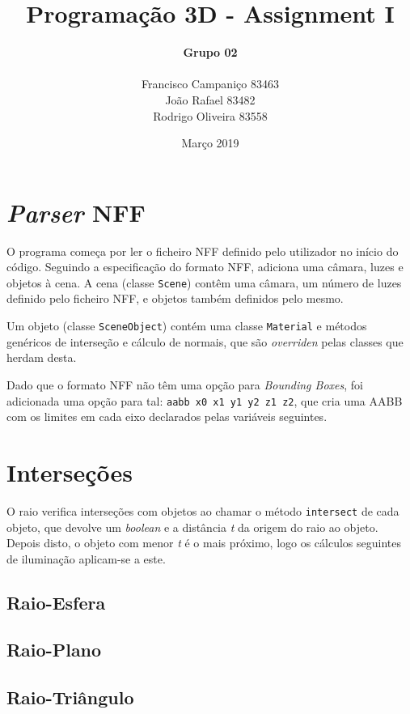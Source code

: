 \documentclass{article}
\title{
    \textbf{Programação 3D - Assignment I}
    }
\author{
    \begin{Large}
        \textbf{Grupo 02}
    \end{Large}\\
    Francisco Campaniço 83463\\
    João Rafael 83482\\
    Rodrigo Oliveira 83558
}
\date{Março 2019}
\begin{document}
    \maketitle

    \section*{\textit{Parser} NFF}

        \par 
        O programa começa por ler o ficheiro NFF definido pelo utilizador no início do código. Seguindo a especificação do formato NFF, adiciona uma câmara, luzes e objetos à cena. A cena (classe \texttt{Scene}) contêm uma câmara, um número de luzes definido pelo ficheiro NFF, e objetos também definidos pelo mesmo.
        \par
        Um objeto (classe \texttt{SceneObject}) contém uma classe \texttt{Material} e métodos genéricos de interseção e cálculo de normais, que são \textit{overriden} pelas classes que herdam desta.
        \par
        Dado que o formato NFF não têm uma opção para \textit{Bounding Boxes}, foi adicionada uma opção para tal: \texttt{aabb x0 x1 y1 y2 z1 z2}, que cria uma AABB com os limites em cada eixo declarados pelas variáveis seguintes.

    \section*{Interseções}

        \par
        O raio verifica interseções com objetos ao chamar o método \texttt{intersect} de cada objeto, que devolve um \textit{boolean} e a distância \textit{t} da origem do raio ao objeto. Depois disto, o objeto com menor \textit{t} é o mais próximo, logo os cálculos seguintes de iluminação aplicam-se a este.

    \subsection*{Raio-Esfera}

    \subsection*{Raio-Plano}

    \subsection*{Raio-Triângulo}
\end{document}
